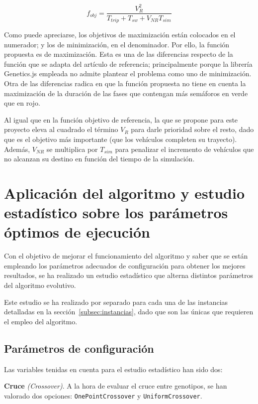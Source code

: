 $$
f_{obj} = \frac{V_R^2}{T_{trip} + T_{sw} + V_{NR} T_{sim}}
$$

Como puede apreciarse, los objetivos de maximización están colocados en el numerador; y los de minimización, en el denominador. Por ello, la función propuesta es de maximización. Esta es una de las diferencias respecto de la función que se adapta del artículo de referencia; principalmente porque la librería Genetics.js empleada no admite plantear el problema como uno de minimización. Otra de las diferencias radica en que la función propuesta no tiene en cuenta la maximización de la duración de las fases que contengan más semáforos en verde que en rojo.

Al igual que en la función objetivo de referencia, la que se propone para este proyecto eleva al cuadrado el término $V_R$ para darle prioridad sobre el resto, dado que es el objetivo más importante (que los vehículos completen su trayecto). Además, $V_{NR}$ se multiplica por $T_{sim}$ para penalizar el incremento de vehículos que no alcanzan su destino en función del tiempo de la simulación.

\section{Aplicación del algoritmo y estudio estadístico sobre los parámetros óptimos de ejecución}

Con el objetivo de mejorar el funcionamiento del algoritmo y saber que se están empleando los parámetros adecuados de configuración para obtener los mejores resultados, se ha realizado un estudio estadístico que alterna distintos parámetros del algoritmo evolutivo.

Este estudio se ha realizado por separado para cada una de las instancias detalladas en la sección~\ref{subsec:instancias}, dado que son las únicas que requieren el empleo del algoritmo.

\subsection{Parámetros de configuración}
\label{subsec:parametros}

Las variables tenidas en cuenta para el estudio estadístico han sido dos:

\textbf{Cruce} \textit{(Crossover)}. A la hora de evaluar el cruce entre genotipos, se han valorado dos opciones: \texttt{OnePointCrossover} y \texttt{UniformCrossover}.


